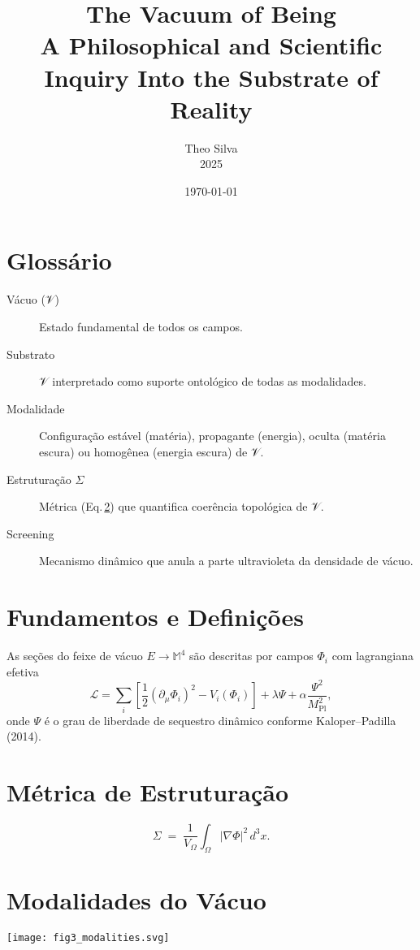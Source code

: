 \documentclass[12pt]{article}
\title{The Vacuum of Being \\ \large A Philosophical and Scientific Inquiry Into the Substrate of Reality}
\author{Theo Silva \\ 2025}
\date{\today}
\begin{document}
\maketitle
\tableofcontents
\newpage

\section*{Glossário}
\begin{description}
  \item[Vácuo (𝒱)] Estado fundamental de todos os campos.
  \item[Substrato] 𝒱 interpretado como suporte ontológico de todas as modalidades.
  \item[Modalidade] Configuração estável (matéria), propagante (energia), oculta (matéria escura) ou homogênea (energia escura) de 𝒱.
  \item[Estruturação $\Sigma$] Métrica (Eq.\,\ref{eq:sigma}) que quantifica coerência topológica de 𝒱.
  \item[Screening] Mecanismo dinâmico que anula a parte ultravioleta da densidade de vácuo.
\end{description}

\section{Fundamentos e Definições}
As seções do feixe de vácuo $E\rightarrow\mathbb{M}^4$ são descritas por campos $\Phi_i$ com lagrangiana efetiva
\begin{equation}
\mathcal{L} = \sum_i\left[\frac12(\partial_\mu\Phi_i)^2 - V_i(\Phi_i)\right] + \lambda \Psi + \alpha\frac{\Psi^2}{M_{\text{Pl}}^2},
\end{equation}
onde $\Psi$ é o grau de liberdade de sequestro dinâmico conforme Kaloper--Padilla (2014).

\section{Métrica de Estruturação}
\label{eq:sigma}
\begin{equation}
\Sigma \;=\;\frac{1}{V_\Omega}\int_\Omega |\nabla\Phi|^{2}\,d^{3}x.
\end{equation}

\section{Modalidades do Vácuo}
\begin{center}
\texttt{[image: fig3\_modalities.svg]}
\end{center}
\end{document}
